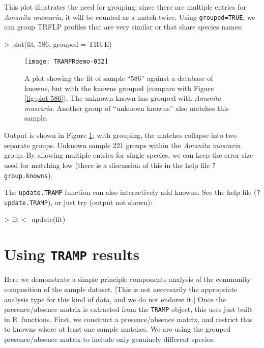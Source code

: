 \documentclass[a4paper]{article}
\newcommand\code\texttt
\newcommand\R{\textsf{R}}
\newcommand{\help}[1]{\texttt{?#1}}
\begin{document}
This plot illustrates the need for grouping; since there are multiple
entries for \textit{Amanita muscaria}, it will be counted as a match
twice.  Using \code{grouped=TRUE}, we can group TRFLP profiles that
are very similar or that share species names:

\begin{Schunk}
\begin{Sinput}
> plot(fit, 586, grouped = TRUE)
\end{Sinput}
\end{Schunk}

\begin{figure}
  \centering
\texttt{[image: TRAMPRdemo-032]}
\caption{A plot showing the fit of sample ``586'' against a database
  of knowns, but with the knowns grouped (compare with Figure
  \ref{fig:plot-586}).  The unknown known has grouped with
  \textit{Amanita muscaria}.  Another group of ``unknown knowns'' also
  matches this sample.
}
\label{fig:plot-586-grouped}
\end{figure}

Output is shown in Figure \ref{fig:plot-586-grouped}; with grouping,
the matches collapse into two separate groups.  Unknown sample 221
groups within the \textit{Amanita muscaria} group.  By allowing
multiple entries for single species, we can keep the error size used
for matching low (there is a discussion of this in the help file
\help{group.knowns}).

The \code{update.TRAMP} function can also interactively add knowns.
See the help file (\help{update.TRAMP}), or just try (output not
shown):

\begin{Schunk}
\begin{Sinput}
> fit <- update(fit)
\end{Sinput}
\end{Schunk}

\section{Using \code{TRAMP} results}

Here we demonstrate a simple principle components analysis of the
community composition of the sample dataset.  [This is not neccesarily
the appropriate analysis type for this kind of data, and we do not
endorse it.]  Once the presence/absence matrix is extracted from the
\code{TRAMP} object, this uses just built-in \R\ functions.  First, we
construct a presence/absence matrix, and restrict this to knowns where
at least one sample matches.  We are using the grouped
presence/absence matrix to include only genuinely different species.
\end{document}
